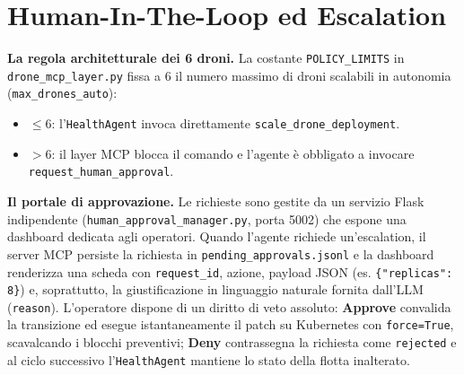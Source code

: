 \section{Human-In-The-Loop ed Escalation}
\label{sec:hitl_escalation}

\textbf{La regola architetturale dei 6 droni.} La costante \texttt{POLICY\_LIMITS} in \texttt{drone\_mcp\_layer.py} fissa a 6 il numero massimo di droni scalabili in autonomia (\texttt{max\_drones\_auto}):
\begin{itemize}
    \item $\le 6$: l'\texttt{HealthAgent} invoca direttamente \texttt{scale\_drone\_deployment}.
    \item $> 6$: il layer MCP blocca il comando e l'agente è obbligato a invocare \texttt{request\_human\_approval}.
\end{itemize}

\textbf{Il portale di approvazione.} Le richieste sono gestite da un servizio Flask indipendente (\texttt{human\_approval\_manager.py}, porta 5002) che espone una dashboard dedicata agli operatori. Quando l'agente richiede un'escalation, il server MCP persiste la richiesta in \texttt{pending\_approvals.jsonl} e la dashboard renderizza una scheda con \texttt{request\_id}, azione, payload JSON (es. \texttt{\{"replicas": 8\}}) e, soprattutto, la giustificazione in linguaggio naturale fornita dall'LLM (\texttt{reason}). L'operatore dispone di un diritto di veto assoluto: \textbf{Approve} convalida la transizione ed esegue istantaneamente il patch su Kubernetes con \texttt{force=True}, scavalcando i blocchi preventivi; \textbf{Deny} contrassegna la richiesta come \texttt{rejected} e al ciclo successivo l'\texttt{HealthAgent} mantiene lo stato della flotta inalterato.
